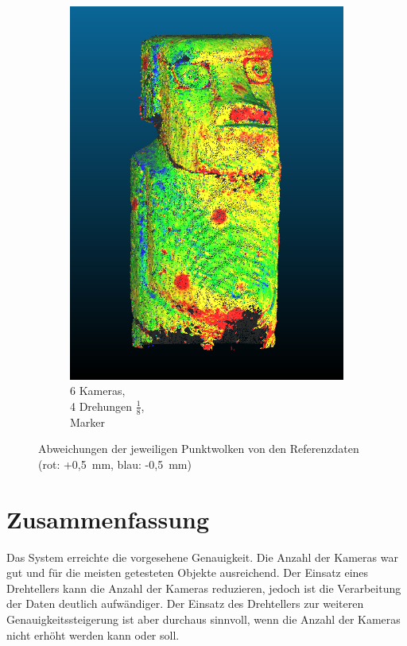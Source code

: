 \documentclass[./00PhotoBox.tex]{subfiles}
\begin{document}
\begin{figure}
\begin{subfigure}{0.24\textwidth}
        \includegraphics[width=1\linewidth]{img/cam_anzahl/justOneRow4TurnsRedefined.png}
        \centering
        \caption{6 Kameras,\\4 Drehungen $\frac{1}{8}$,\\Marker} %
        \label{img:moai_eineEbene_mitMarkern} %
    \end{subfigure}

    \caption{Abweichungen der jeweiligen Punktwolken von den Referenzdaten (rot: +0,5~mm, blau: -0,5~mm)} %
\end{figure}

\section{Zusammenfassung}
Das System erreichte die vorgesehene Genauigkeit. Die Anzahl der Kameras war gut und für die meisten getesteten Objekte ausreichend. Der Einsatz eines Drehtellers kann die Anzahl der Kameras reduzieren, jedoch ist die Verarbeitung der Daten deutlich aufwändiger. Der Einsatz des Drehtellers zur weiteren Genauigkeitssteigerung ist aber durchaus sinnvoll, wenn die Anzahl der Kameras nicht erhöht werden kann oder soll.

\biblio
\end{document}
